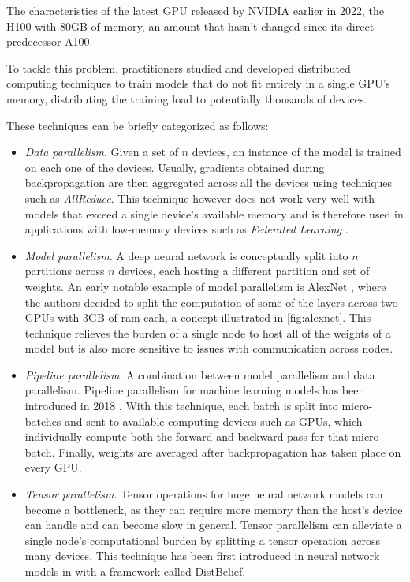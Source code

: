 The characteristics of the latest GPU released by NVIDIA earlier in 2022, the H100 with 80GB of memory, an amount that hasn't changed since its direct predecessor A100.

To tackle this problem, practitioners studied and developed distributed computing techniques to train models that do not fit entirely in a single GPU's memory, distributing the training load to potentially thousands of devices.

These techniques can be briefly categorized as follows:
\begin{itemize}
    \item \textit{Data parallelism}.
          Given a set of $n$ devices, an instance of the model is trained on each one of the devices.
          Usually, gradients obtained during backpropagation are then aggregated across all the devices using techniques such as \textit{AllReduce}.
          This technique however does not work very well with models that exceed a single device's available memory and is therefore used in applications with low-memory devices such as \textit{Federated Learning} \cite{li2019federatedlearning}.

    \item \textit{Model parallelism}.
          A deep neural network is conceptually split into $n$ partitions across $n$ devices, each hosting a different partition and set of weights.
          An early notable example of model parallelism is AlexNet \cite{alexnet2012}, where the authors decided to split the computation of some of the layers across two GPUs with 3GB of ram each, a concept illustrated in \autoref{fig:alexnet}.
          This technique relieves the burden of a single node to host all of the weights of a model but is also more sensitive to issues with communication across nodes.

    \item \textit{Pipeline parallelism}.
          A combination between model parallelism and data parallelism.
          Pipeline parallelism for machine learning models has been introduced in 2018 \cite{huang2018gpipe}.
          With this technique, each batch is split into micro-batches and sent to available computing devices such as GPUs, which individually compute both the forward and backward pass for that micro-batch.
          Finally, weights are averaged after backpropagation has taken place on every GPU.

    \item \textit{Tensor parallelism}.
          Tensor operations for huge neural network models can become a bottleneck, as they can require more memory than the host's device can handle and can become slow in general.
          Tensor parallelism can alleviate a single node's computational burden by splitting a tensor operation across many devices.
          This technique has been first introduced in neural network models in \cite{dean2012distbelief} with a framework called DistBelief.


\end{itemize}
